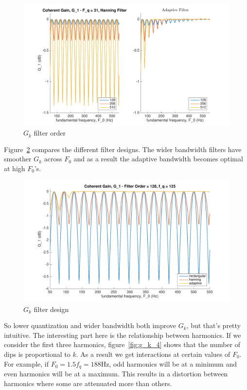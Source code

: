\documentclass [11pt, proquest,oneside] {uwthesis}[2015/03/03]
\begin{document}
\begin{figure}[!ht]
  \centering
    \includegraphics[width=1\textwidth]{g_k_2}   
    \caption{$G_k$ filter order}\label{fig:g_k_2}
\end{figure}

Figure~\ref{fig:g_k_3} compares the different filter designs.  The wider bandwidth filters have smoother $G_k$ across $F_0$ and as a result the adaptive bandwidth becomes optimal at high $F_0$'s.

\begin{figure}[!ht]
  \centering
    \includegraphics[width=1\textwidth]{g_k_3}   
    \caption{$G_k$ filter design}\label{fig:g_k_3}
\end{figure}

So lower quantization and wider bandwidth both improve $G_k$, but that's pretty intuitive.  The interesting part here is the relationship between harmonics.  If we consider the first three harmonics, figure~\ref{fig:g_k_4} shows that the number of dips is proportional to $k$.  As a result we get interactions at certain values of $F_0$.  For example, if $F_0 = 1.5f_q = 188$Hz, odd harmonics will be at a minimum and even harmonics will be at a maximum.  This results in a distortion between harmonics where some are attenuated more than others.
\end{document}
